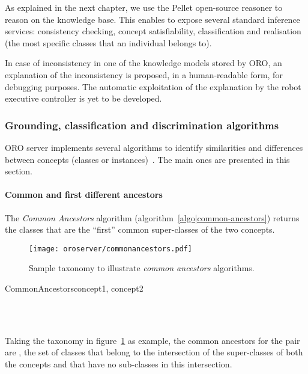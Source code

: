 As explained in the next chapter, we use the Pellet open-source reasoner to
reason on the knowledge base. This enables to expose several standard inference
services: consistency checking, concept satisfiability, classification and
realisation (the most specific classes that an individual belongs to).

In case of inconsistency in one of the knowledge models stored by ORO, an explanation
of the inconsistency is proposed, in a human-readable form, for debugging
purposes. The automatic exploitation of the explanation by the robot executive
controller is yet to be developed.

\subsubsection{Grounding, classification and discrimination algorithms}
\label{sect|discrimination}

ORO server implements several algorithms to identify similarities and
differences between concepts (classes or instances)~\cite{Ros2010b}. The main
ones are presented in this section.

\paragraph{Common and first different ancestors} The \emph{Common Ancestors}
algorithm (algorithm~\ref{algo|common-ancestors}) returns the classes that
are the ``first'' common super-classes of the two concepts.

\begin{figure}
    \centering
    \texttt{[image: oroserver/commonancestors.pdf]}
    \caption{Sample taxonomy to illustrate \emph{common ancestors} algorithms.}
    \label{fig|common-ancestors}
\end{figure}

\small
\begin{pseudocode}[ruled]{CommonAncestors}{concept1, concept2}
\label{algo|common-ancestors}

\BEGIN
{} \GETS {} \cap {} \\
\\
\END

\end{pseudocode}
\normalsize

Taking the taxonomy in figure~\ref{fig|common-ancestors} as example, the common
ancestors for the pair  are
, \ie the set of classes that belong to
the intersection of the super-classes of both the concepts and that have no
sub-classes in this intersection.

